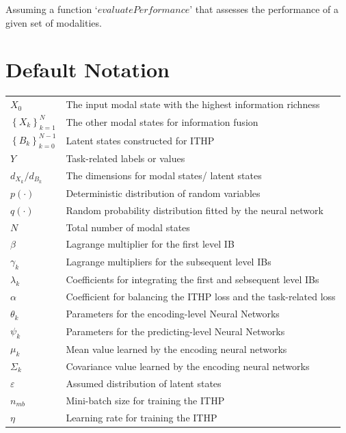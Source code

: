 \documentclass{article} %
\begin{document}
Assuming a function `$evaluatePerformance$' that assesses the performance of a given set of modalities.



\section{Default Notation}

\def\arraystretch{1.5}
\begin{center}
\begin{tabular}{p{1.5in}p{3.5in}}

$\displaystyle X_{0}$ & The input modal state with the highest information richness\\
$\displaystyle \left \{ X_{k} \right \} _{k=1}^{N} $ & The other modal states for information fusion \\
$\displaystyle \left \{ B_{k} \right \} _{k=0}^{N-1} $ & Latent states constructed for ITHP\\
$\displaystyle Y$ & Task-related labels or values \\
$\displaystyle d_{X_{k}} /d_{B_{k}}$ & The dimensions for modal states/ latent states \\
$\displaystyle p\left ( \cdot  \right ) $ & Deterministic distribution of random variables\\
$\displaystyle q\left ( \cdot  \right ) $ & Random probability distribution fitted by the neural network\\
$\displaystyle N$ & Total number of modal states \\
$\displaystyle \beta$ & Lagrange multiplier for the first level IB \\
$\displaystyle \gamma_{k}$ & Lagrange multipliers for the subsequent level IBs\\
$\displaystyle \lambda_{k}$ & Coefficients for integrating the first and sebsequent level IBs\\
$\displaystyle \alpha$ & Coefficient for balancing the ITHP loss and the task-related loss\\
$\displaystyle \theta_{k}$ &  Parameters for the encoding-level Neural Networks\\
$\displaystyle \psi_{k}$ & Parameters for the predicting-level Neural Networks\\
$\displaystyle \mu_{k}$ & Mean value learned by the encoding neural networks\\
$\displaystyle \Sigma_{k}$ & Covariance value learned by the encoding neural networks \\
$\displaystyle \varepsilon $ & Assumed distribution of latent states\\
$\displaystyle n_{mb}$ & Mini-batch size for training the ITHP\\
$\displaystyle \eta$ & Learning rate for training the ITHP\\
\end{tabular}
\end{center}
\end{document}
